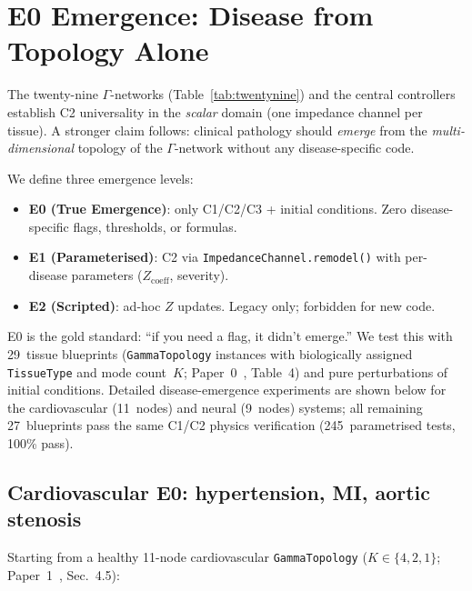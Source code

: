 \documentclass[aps,pre,twocolumn,superscriptaddress,floatfix]{revtex4-2}
\begin{document}
\section{E0 Emergence: Disease from Topology Alone}
\label{sec:e0-emergence}

The twenty-nine $\Gamma$-networks (Table~\ref{tab:twentynine})
and the central controllers establish C2 universality
in the \emph{scalar} domain (one impedance channel per tissue).
A stronger claim follows: clinical pathology should
\emph{emerge} from the \emph{multi-dimensional} topology
of the $\Gamma$-network without any disease-specific code.

We define three emergence levels:
\begin{itemize}
  \item \textbf{E0 (True Emergence)}: only C1/C2/C3 + initial
    conditions.  Zero disease-specific flags, thresholds, or formulas.
  \item \textbf{E1 (Parameterised)}: C2 via
    \texttt{ImpedanceChannel.remodel()} with per-disease
    parameters ($Z_{\text{coeff}}$, severity).
  \item \textbf{E2 (Scripted)}: ad-hoc $Z$ updates.
    Legacy only; forbidden for new code.
\end{itemize}

\noindent
E0 is the gold standard: ``if you need a flag, it didn't
emerge.''
We test this with 29~tissue blueprints (\texttt{GammaTopology}
instances with biologically assigned \texttt{TissueType} and
mode count~$K$; Paper~0~\cite{Paper0}, Table~4)
and pure perturbations of initial conditions.
Detailed disease-emergence experiments are shown below for
the cardiovascular (11~nodes) and neural (9~nodes) systems;
all remaining 27~blueprints pass the same C1/C2 physics
verification (245~parametrised tests, 100\% pass).

\subsection{Cardiovascular E0: hypertension, MI, aortic stenosis}

Starting from a healthy 11-node cardiovascular
\texttt{GammaTopology} ($K \in \{4, 2, 1\}$;
Paper~1~\cite{Paper1}, Sec.~4.5):
\end{document}
